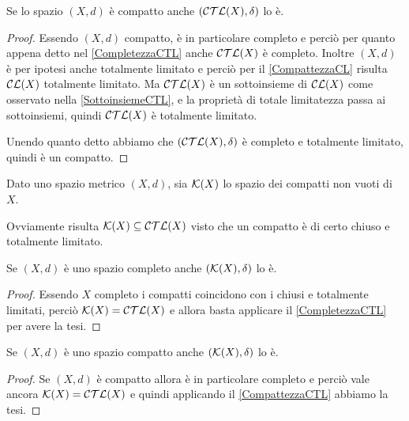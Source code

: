\begin{corollary}\label{CompattezzaCTL}
	Se lo spazio $(X,d)$ è compatto anche $(\mathcal{CTL}(X),\delta)$ lo è.
\end{corollary}
\begin{proof}
	Essendo $(X,d)$ compatto, è in particolare completo e perciò per quanto appena detto nel \cref{CompletezzaCTL} anche $\mathcal{CTL}(X)$ è completo. Inoltre $(X,d)$ è per ipotesi anche totalmente limitato e perciò per il \cref{CompattezzaCL} risulta $\mathcal{CL}(X)$ totalmente limitato. Ma $\mathcal{CTL}(X)$ è un sottoinsieme di $\mathcal{CL}(X)$ come osservato nella \cref{SottoinsiemeCTL}, e la proprietà di totale limitatezza passa ai sottoinsiemi, quindi $\mathcal{CTL}(X)$ è totalmente limitato.
	
	Unendo quanto detto abbiamo che $(\mathcal{CTL}(X),\delta)$ è completo e totalmente limitato, quindi è un compatto.
\end{proof}

\begin{definition}
	Dato uno spazio metrico $(X,d)$, sia $\mathcal{K}(X)$ lo spazio dei compatti non vuoti di $X$.
\end{definition}
\begin{remark}
	Ovviamente risulta $\mathcal{K}(X)\subseteq \mathcal{CTL}(X)$ visto che un compatto è di certo chiuso e totalmente limitato.
\end{remark}

\begin{corollary}
	Se $(X,d)$ è uno spazio completo anche $(\mathcal{K}(X),\delta)$ lo è.
\end{corollary}
\begin{proof}
	Essendo $X$ completo i compatti coincidono con i chiusi e totalmente limitati, perciò $\mathcal{K}(X)=\mathcal{CTL}(X)$ e allora basta applicare il \cref{CompletezzaCTL} per avere la tesi.
\end{proof}


\begin{corollary}
	Se $(X,d)$ è uno spazio compatto anche $(\mathcal{K}(X),\delta)$ lo è.
\end{corollary}
\begin{proof}
	Se $(X,d)$ è compatto allora è in particolare completo e perciò vale ancora $\mathcal{K}(X)=\mathcal{CTL}(X)$ e quindi applicando il \cref{CompattezzaCTL} abbiamo la tesi. 
\end{proof}






